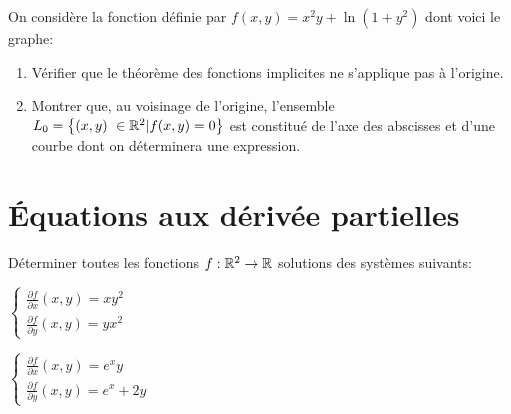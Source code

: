\documentclass{tp_um}
\begin{document}
\exo[*]{} On considère la fonction définie par $f(x,y) = x^2 y + \ln(1+y^2)$ dont voici le graphe:
\begin{center}
    
\end{center}
\begin{enumerate}
    \item Vérifier que le théorème des fonctions implicites ne s'applique pas à l'origine.
    \item Montrer que, au voisinage de l'origine, l'ensemble $ L_0 = \left\{ (x,y)  \in \R^2 | f(x,y) =0\right\}$ est constitué de l'axe des abscisses et d'une courbe dont on déterminera une expression. %
\end{enumerate}

\section{\'Equations aux dérivée partielles}

Déterminer toutes les fonctions $f: \mathbb{R}^2 \to \mathbb{R}$ solutions des systèmes suivants:

\begin{enumerate*}
	\item $\begin{cases}
				\frac{\partial f}{\partial x} (x,y) = xy^2  \\
				\frac{\partial f}{\partial y} (x,y) = yx^2 
		\end{cases}$
	\item $\begin{cases}
				\frac{\partial f}{\partial x} (x,y) = e^x y  \\
				\frac{\partial f}{\partial y} (x,y) = e^x + 2y 
		\end{cases}$
\end{enumerate*}
\end{document}

